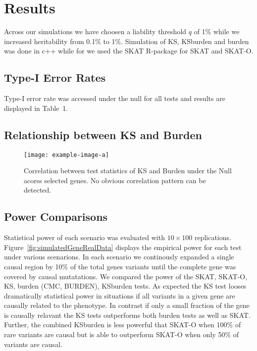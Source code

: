 \section{Results}
\label{sec:results}

Across our simulations we have choosen a liability threshold $q$ of 1\% while we increased heritability from 0.1\% to 1\%.
Simulation of KS, KSburden and burden was done in c++ while for we used the SKAT R-package for SKAT and SKAT-O. %

\subsection{Type-I Error Rates}
\label{sub:type_i_error_rates}

Type-I error rate was accessed under the null for all tests and results are displayed in Table~1. 

\subsection{Relationship between KS and Burden}
\label{sub:relationship_between_ks_and_burden}

\begin{figure}[ht!]
  \centering
  \texttt{[image: example-image-a]}
  \caption{Correlation between test statistics of KS and Burden under the Null acorss selected genes. No obvious correlation pattern can be detected.}\label{fig:correlation_ks_burden}
\end{figure}

\subsection{Power Comparisons}
\label{sub:power_comparisons}

Statistical power of each scenario was evaluated with $10\times 100$ replications.
Figure~\ref{fig:simulatedGeneRealData} displays the empirical power for each test under various scenarions.
In each scenario we continously expanded a single causal region by 10\% of the total genes variants until the complete gene was covered by causal mutatations.
We compared the power of the SKAT, SKAT-O, KS, burden (CMC, BURDEN), KSburden tests.
As expected the KS test looses dramatically statistical power in situations if all variants in a given gene are causally related to the phenotype.
In contrast if only a small fraction of the gene is causally relavant the KS tests outperforms both burden tests as well as SKAT\@.
Further, the combined KSburden is less powerful that SKAT-O when 100\% of rare variants are causal but is able to outperform SKAT-O when only 50\% of variants are causal.

